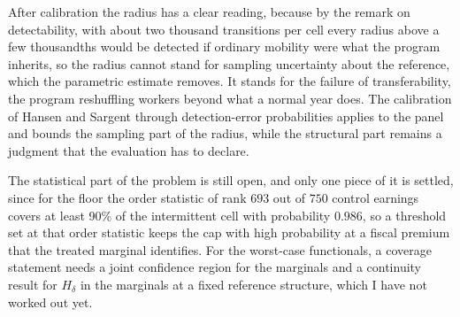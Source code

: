 \documentclass[11pt,a4paper]{article}
\theoremstyle{notesplain}
\theoremstyle{notesupright}
\numberwithin{equation}{section}
\begin{document}
After calibration the radius has a clear reading, because by the remark on detectability, with about two thousand transitions per cell every radius above a few thousandths would be detected if ordinary mobility were what the program inherits, so the radius cannot stand for sampling uncertainty about the reference, which the parametric estimate removes. It stands for the failure of transferability, the program reshuffling workers beyond what a normal year does. The calibration of Hansen and Sargent through detection-error probabilities applies to the panel and bounds the sampling part of the radius, while the structural part remains a judgment that the evaluation has to declare.

The statistical part of the problem is still open, and only one piece of it is settled, since for the floor the order statistic of rank $693$ out of $750$ control earnings covers at least 90\% of the intermittent cell with probability $0.986$, so a threshold set at that order statistic keeps the cap with high probability at a fiscal premium that the treated marginal identifies. For the worst-case functionals, a coverage statement needs a joint confidence region for the marginals and a continuity result for $H_\delta$ in the marginals at a fixed reference structure, which I have not worked out yet.
\end{document}
